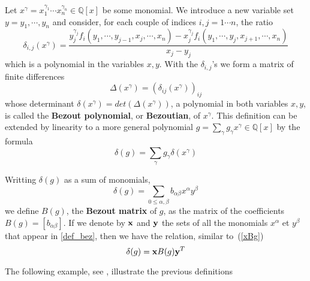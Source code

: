 \documentclass{standalone}
\begin{document}
\begin{defn}
Let $x^\gamma = x_1^{\gamma_1}\cdots x_n^{\gamma_n} \in \mathbb{Q}[x]$ be some monomial.
We introduce a new variable set $y = y_1,\cdots, y_n$ and consider, for each couple of indices $i, j = 1\cdots n$, the ratio
\begin{equation}
\label{finite_diff}
\delta_{i,j}(x^\gamma) = \dfrac{y_j^{\gamma_j}f_i(y_1,\cdots, y_{j-1},x_j,\cdots,x_n) - x_j^{\gamma_j}f_i(y_1,\cdots,y_j,x_{j+1},\cdots,x_n)}{x_j - y_j}
\end{equation}
which is a polynomial in the variables $x, y$. 
With the $\delta_{i,j}$'s we form a matrix of finite differences
\begin{equation}
\label{Delta}
\Delta(x^\gamma) = (\delta_{ij}(x^\gamma))_{ij}
\end{equation}
whose determinant $\delta(x^\gamma) = det(\Delta(x^\gamma))$, a polynomial in both variables $x, y$, is called the {\bf Bezout polynomial}, or {\bf Bezoutian}, of $x^\gamma$.
This definition can be extended by linearity to a more general polynomial $g = \sum_\gamma g_\gamma x^\gamma \in \mathbb{Q}[x]$ by the formula
$$\delta(g) = \sum_\gamma g_\gamma \delta(x^\gamma)$$


Writting $\delta(g)$ as a sum of monomials, 
\begin{equation}
\label{def_bez}
\delta(g) = \sum_{0 \le \alpha,\beta} b_{\alpha\beta} x^\alpha y^\beta
\end{equation} 
we define $B(g)$, the {\bf Bezout matrix} of $g$, as the matrix of the coefficients $B(g) = [b_{\alpha\beta}]$. If we denote by $\bold{x}$ and $\bold{y}$ the sets of all the monomials $x^\alpha$ et $y^\beta$ that appear in \ref{def_bez}, then we have the relation, similar to~(\ref{xBg})
\begin{equation}
	\delta(g) = \bold{x} B(g) \bold{y}^T
\end{equation}
\end{defn}
The following example, see \cite{jpc}, illustrate the previous definitions
\end{document}
